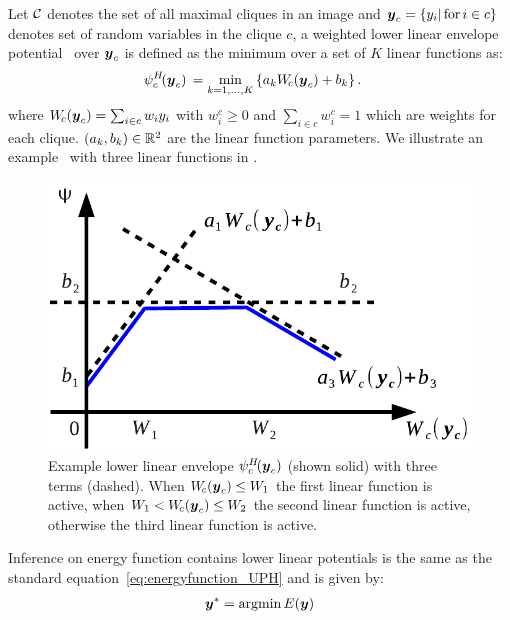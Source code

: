 Let ${\cal C}$ denotes the set of all maximal cliques in an image and
${\boldsymbol{y}}_c=\{y_i |\text{\,for\,} i \in c\}$ denotes set of random
variables in the clique $c$, a weighted lower linear envelope
potential~\cite{gouldlearning} over ${\boldsymbol{y}}_c$ is defined as the
minimum over a set of $K$ linear functions as:
%
\begin{align}
  \psi^H_c\!({\boldsymbol{y}}_c) \, &= \min_{k=1, \ldots, K} \left\{ a_k W_{\!c}({\boldsymbol{y}}_c) + b_k \right\}.
  \label{eqn:potential2}
\end{align}
%
where $W_{\!c}({\boldsymbol{y}}_c) = \sum_{i \in c} w_i y_i$ with $w^c_i \geq
0$ and $\sum_{i \in c} w^c_i = 1$ which are weights for each
clique. $(a_k, b_k) \in \mathbb{R}^2$ are the linear function
parameters. We illustrate an example~\cite{gouldlearning} with
three linear functions in .
%
\begin{figure}[ht]
  \centering
  \includegraphics[width=0.6\columnwidth]{Methodology/figures/not_redundant}
  \caption{\label{fig:nonredundant} Example lower linear envelope
    $\psi^H_c\!({\boldsymbol{y}}_c)$ (shown solid) with three terms (dashed).
    When $W_{\!c}({\boldsymbol{y}}_c) \leq W_1$ the first linear function is
    active, when $W_1 < W_{\!c}({\boldsymbol{y}}_c) \leq W_2$ the second
    linear function is active, otherwise the third linear
    function is active.}
\end{figure}

Inference on energy function contains lower linear potentials is
the same as the standard equation~\eqref{eq:energyfunction_UPH}
and is given by:
\begin{align}
  \label{eq:min_energy}
  {\boldsymbol{y}}^* = \mathop{\textrm{argmin}}E\!\left({\boldsymbol{y}}\right)
\end{align}


